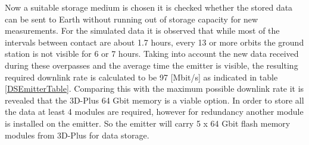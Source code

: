 Now a suitable storage medium is chosen it is checked whether the stored data can be sent to Earth without running out of storage capacity for new measurements. For the simulated data it is observed that while most of the intervals between contact are about 1.7 hours, every 13 or more orbits the ground station is not visible for 6 or 7 hours. Taking into account the new data received during these overpasses and the average time the emitter is visible, the resulting required downlink rate is calculated to be 97 [Mbit/s] as indicated in table \ref{DSEmitterTable}. Comparing this with the maximum possible downlink rate it is revealed that the 3D-Plus 64 Gbit memory is a viable option. In order to store all the data at least 4 modules are required, however for redundancy another module is installed on the emitter. So the emitter will carry 5 x 64 Gbit flash memory modules from 3D-Plus for data storage.